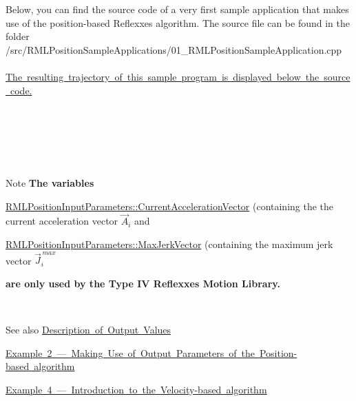 Below, you can find the source code of a very first sample application that makes use of the position-\/based Reflexxes algorithm. The source file can be found in the folder~\newline
~\newline
{\ttfamily /src/\+R\+M\+L\+Position\+Sample\+Applications/01\+\_\+\+R\+M\+L\+Position\+Sample\+Application.cpp}~\newline
~\newline
\mbox{\hyperlink{page_Code_01_RMLPositionSampleApplication_anc_PositionExample1}{The resulting trajectory of this sample program is displayed below the source code.}}

~\newline
~\newline
 
\begin{DoxyCodeInclude}{0}
\end{DoxyCodeInclude}


~\newline
~\newline
\label{page_Code_01_RMLPositionSampleApplication_anc_PositionExample1}%
%
 

~\newline
 \begin{DoxyNote}{Note}
{\bfseries{The variables}}~\newline
~\newline

\begin{DoxyItemize}
\item \mbox{\hyperlink{classRMLInputParameters_a423bf4b1ef337cbf6eee22fe2e2502c1}{R\+M\+L\+Position\+Input\+Parameters\+::\+Current\+Acceleration\+Vector}} (containing the the current acceleration vector $ \vec{A}_i$ and~\newline
~\newline
 
\item \mbox{\hyperlink{classRMLInputParameters_a5968ce643868260410f149996c446b66}{R\+M\+L\+Position\+Input\+Parameters\+::\+Max\+Jerk\+Vector}} (containing the maximum jerk vector $ \vec{J}_i^{\,max} $ ~\newline
~\newline
 
\end{DoxyItemize}{\bfseries{are only used by the Type IV Reflexxes Motion Library.}}
\end{DoxyNote}
~\newline
~\newline
 \begin{DoxySeeAlso}{See also}
\mbox{\hyperlink{page_OutputValues}{Description of Output Values}} 

\mbox{\hyperlink{page_Code_02_RMLPositionSampleApplication}{Example 2 --- Making Use of Output Parameters of the Position-\/based algorithm}} 

\mbox{\hyperlink{page_Code_04_RMLVelocitySampleApplication}{Example 4 --- Introduction to the Velocity-\/based algorithm}} 
\end{DoxySeeAlso}
